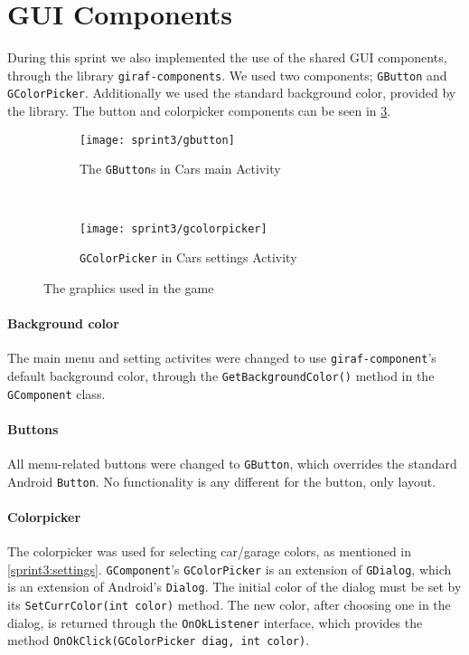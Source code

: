 \section{GUI Components}\label{sprint3:gui}
During this sprint we also implemented the use of the shared GUI components, through the library \lstinline|giraf-components|.
We used two components; \lstinline|GButton| and \lstinline|GColorPicker|.
Additionally we used the standard background color, provided by the library.
The button and colorpicker components can be seen in \cref{sprint3:guicomponents:fig}.

\begin{figure}[h]
\begin{subfigure}{0.49\textwidth}
\centering
\texttt{[image: sprint3/gbutton]}
\caption{The \lstinline|GButton|s in Cars main Activity}
\label{sprint3:guicomponents:fig:gbutton}
\end{subfigure}
~
\begin{subfigure}{0.49\textwidth}
\centering
\texttt{[image: sprint3/gcolorpicker]}
\caption{\lstinline|GColorPicker| in Cars settings Activity}
\label{sprint3:guicomponents:fig:gcolorpicker}
\end{subfigure}

\caption{The graphics used in the game}
\label{sprint3:guicomponents:fig}
\end{figure}

\paragraph{Background color}
The main menu and setting activites were changed to use \lstinline|giraf-component|'s default background color, through the \lstinline|GetBackgroundColor()| method in the \lstinline|GComponent| class.

\paragraph{Buttons}
All menu-related buttons were changed to \lstinline|GButton|, which overrides the standard Android \lstinline|Button|.
No functionality is any different for the button, only layout.

\paragraph{Colorpicker}
The colorpicker was used for selecting car/garage colors, as mentioned in \cref{sprint3:settings}.
\lstinline|GComponent|'s \lstinline|GColorPicker| is an extension of \lstinline|GDialog|, which is an extension of Android's \lstinline|Dialog|.
The initial color of the dialog must be set by its \lstinline|SetCurrColor(int color)| method.
The new color, after choosing one in the dialog, is returned through the \lstinline|OnOkListener| interface, which provides the method \lstinline|OnOkClick(GColorPicker diag, int color)|.